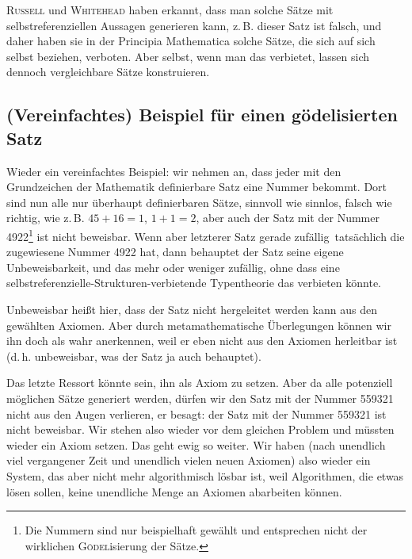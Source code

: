 \textsc{Russell} und \textsc{Whitehead} haben erkannt, dass man solche Sätze mit selbstreferenziellen
Aussagen generieren kann, z.\,B. \frq dieser Satz ist falsch\flq, und daher haben sie
in der Principia Mathematica solche Sätze, die sich auf sich selbst beziehen,
\frq verboten\flq{}. 
Aber selbst, wenn man das verbietet, lassen sich dennoch ver\-gleich\-bare Sätze
konstruieren.

\subsection*{(Vereinfachtes) Beispiel für einen gödelisierten Satz}

Wieder ein vereinfachtes Beispiel: wir nehmen an, dass jeder mit den Grundzeichen
der Mathematik definierbare Satz eine Nummer bekommt. Dort sind nun alle nur überhaupt
definierbaren Sätze, sinnvoll wie sinnlos, falsch wie richtig,
wie z.\,B. \frq $45 + 16 = 1$\flq, \frq $1 + 1 = 2$\flq, aber auch \frq der Satz mit
der Nummer 4922\footnote{Die Nummern sind nur beispielhaft gewählt und entsprechen
nicht der wirklichen \textsc{Gödel}isierung der Sätze.}
ist nicht beweisbar\flq. Wenn aber letzterer Satz gerade
\frq zufällig\flq\ tatsächlich die zugewiesene Nummer 4922 hat, dann behauptet
der Satz seine eigene Unbeweisbarkeit, und das mehr oder weniger
zufällig, ohne dass eine selbstreferenzielle-Strukturen-verbietende
Typentheorie das verbieten könnte.

Unbeweisbar heißt hier, dass der Satz nicht hergeleitet werden kann aus den gewählten
Axiomen. Aber durch metamathematische Überlegungen können wir ihn doch als wahr anerkennen,
weil er eben nicht aus den Axiomen herleitbar ist (d.\,h. unbeweisbar, was der
Satz ja auch behauptet).

Das letzte Ressort könnte sein, ihn als Axiom zu setzen. Aber da alle potenziell
möglichen Sätze generiert werden, dürfen wir den Satz mit der Nummer 559321 nicht
aus den Augen verlieren, er besagt: \frq der Satz mit der Nummer 559321 ist
nicht beweisbar\flq{}. Wir
stehen also wieder vor dem gleichen Problem und müssten
wieder ein Axiom setzen. Das geht ewig so weiter. Wir haben (nach unendlich viel
vergangener Zeit und unendlich vielen neuen Axiomen) also wieder ein System,
das aber nicht mehr algorithmisch lösbar ist, weil Algorithmen, die etwas
lösen sollen, keine unendliche Menge an Axiomen abarbeiten können.

